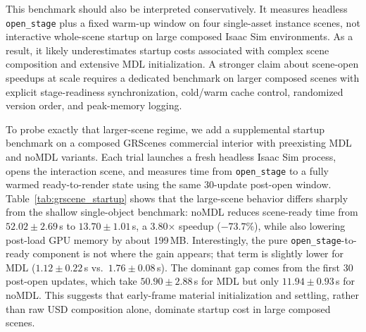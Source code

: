 This benchmark should also be interpreted conservatively. It measures headless
\texttt{open\_stage} plus a fixed warm-up window on four single-asset instance
scenes, not interactive whole-scene startup on large composed Isaac Sim
environments. As a result, it likely underestimates startup costs associated
with complex scene composition and extensive MDL initialization. A stronger
claim about scene-open speedups at scale requires a dedicated benchmark on
larger composed scenes with explicit stage-readiness synchronization, cold/warm
cache control, randomized version order, and peak-memory logging.

To probe exactly that larger-scene regime, we add a supplemental startup
benchmark on a composed GRScenes commercial interior with preexisting MDL and
noMDL variants. Each trial launches a fresh headless Isaac Sim process, opens
the interaction scene, and measures time from \texttt{open\_stage} to a fully
warmed ready-to-render state using the same 30-update post-open window.
Table~\ref{tab:grscene_startup} shows that the large-scene behavior differs
sharply from the shallow
single-object benchmark: noMDL reduces scene-ready time from
$52.02 \pm 2.69$\,s to $13.70 \pm 1.01$\,s, a 3.80$\times$ speedup
($-73.7\%$), while also lowering post-load GPU memory by about 199\,MB.
Interestingly, the pure \texttt{open\_stage}-to-ready component is not where
the gain appears; that term is slightly lower for MDL
($1.12 \pm 0.22$\,s vs.\ $1.76 \pm 0.08$\,s). The dominant gap comes from the
first 30 post-open updates, which take $50.90 \pm 2.88$\,s for MDL but only
$11.94 \pm 0.93$\,s for noMDL. This suggests that early-frame material
initialization and settling, rather than raw USD composition alone, dominate
startup cost in large composed scenes.

\begin{table}[t]
\centering
\caption{Supplemental whole-scene startup benchmark on a large GRScenes
commercial interior (3 fresh-process runs per version). Scene-ready time
measures the time from \texttt{open\_stage} to a fully warmed ready-to-render
state after 30 post-open updates.}
\label{tab:grscene_startup}
\end{table}

